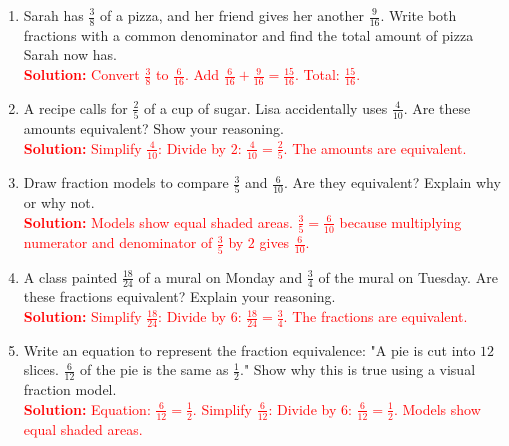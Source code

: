 \documentclass[12pt]{article}
\begin{document}
\begin{tcolorbox}[colframe=black!60, colback=white, 
coltitle=black, colbacktitle=black!15, fonttitle=\bfseries\Large, 
title=Problems, halign title=center, left=10pt, right=10pt, top=10pt, bottom=90pt]
\begin{enumerate}[start=9, itemsep=5em]
    \item Sarah has \( \frac{3}{8} \) of a pizza, and her friend gives her another \( \frac{9}{16} \). Write both fractions with a common denominator and find the total amount of pizza Sarah now has.\\
    \textcolor{red}{\textbf{Solution:} Convert \( \frac{3}{8} \) to \( \frac{6}{16} \). Add \( \frac{6}{16} + \frac{9}{16} = \frac{15}{16}\). Total: \( \frac{15}{16}\).}

    \item A recipe calls for \( \frac{2}{5} \) of a cup of sugar. Lisa accidentally uses \( \frac{4}{10} \). Are these amounts equivalent? Show your reasoning.\\
    \textcolor{red}{\textbf{Solution:} Simplify \( \frac{4}{10} \): Divide by \(2\): \( \frac{4}{10} = \frac{2}{5}\). The amounts are equivalent.}

    \item Draw fraction models to compare \( \frac{3}{5} \) and \( \frac{6}{10} \). Are they equivalent? Explain why or why not.\\
    \textcolor{red}{\textbf{Solution:} Models show equal shaded areas. \( \frac{3}{5} = \frac{6}{10}\) because multiplying numerator and denominator of \( \frac{3}{5} \) by \(2\) gives \( \frac{6}{10}\).}

    \item A class painted \( \frac{18}{24} \) of a mural on Monday and \( \frac{3}{4} \) of the mural on Tuesday. Are these fractions equivalent? Explain your reasoning.\\
    \textcolor{red}{\textbf{Solution:} Simplify \( \frac{18}{24} \): Divide by \(6\): \( \frac{18}{24} = \frac{3}{4}\). The fractions are equivalent.}

    \item Write an equation to represent the fraction equivalence: "A pie is cut into \( 12 \) slices. \( \frac{6}{12} \) of the pie is the same as \( \frac{1}{2} \)." Show why this is true using a visual fraction model.\\
    \textcolor{red}{\textbf{Solution:} Equation: \( \frac{6}{12} = \frac{1}{2}\). Simplify \( \frac{6}{12} \): Divide by \(6\): \( \frac{6}{12} = \frac{1}{2}\). Models show equal shaded areas.}
\end{enumerate}
\end{tcolorbox}
\end{document}
